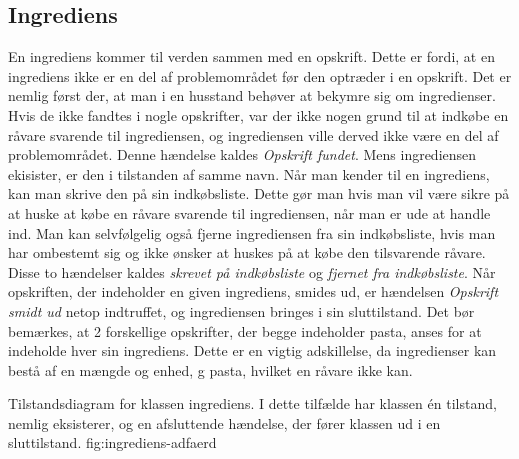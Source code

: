 \subsection{Ingrediens}

En ingrediens kommer til verden sammen med en opskrift. Dette er fordi, at en ingrediens ikke er en del af problemområdet før den optræder i en opskrift. Det er nemlig først der, at man i en husstand behøver at bekymre sig om ingredienser. Hvis de ikke fandtes i nogle opskrifter, var der ikke nogen grund til at indkøbe en råvare svarende til ingrediensen, og ingrediensen ville derved ikke være en del af problemområdet. Denne hændelse kaldes \textit{Opskrift fundet}. Mens ingrediensen ekisister, er den i tilstanden af samme navn. Når man kender til en ingrediens, kan man skrive den på sin indkøbsliste. Dette gør man hvis man vil være sikre på at huske at købe en råvare svarende til ingrediensen, når man er ude at handle ind. Man kan selvfølgelig også fjerne ingrediensen fra sin indkøbsliste, hvis man har ombestemt sig og ikke ønsker at huskes på at købe den tilsvarende råvare. Disse to hændelser kaldes \textit{skrevet på indkøbsliste} og \textit{fjernet fra indkøbsliste}. Når opskriften, der indeholder en given ingrediens, smides ud, er hændelsen \textit{Opskrift smidt ud} netop indtruffet, og ingrediensen bringes i sin sluttilstand. Det bør bemærkes, at 2 forskellige opskrifter, der begge indeholder pasta, anses for at indeholde hver sin ingrediens. Dette er en vigtig adskillelse, da ingredienser kan bestå af en mængde og enhed,  g pasta, hvilket en råvare ikke kan.

  {Tilstandsdiagram for klassen ingrediens. I dette tilfælde har klassen én tilstand, nemlig eksisterer, og en afsluttende hændelse, der fører klassen ud i en sluttilstand.}
  {fig:ingrediens-adfaerd}
